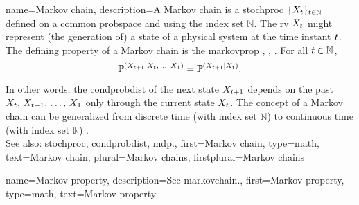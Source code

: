 {name={Markov chain},
	description={A Markov chain is a \gls{stochproc} $\{X_t \}_{t \in \mathbb{N}}$ 
		defined on a common \gls{probspace} and using the index set $\mathbb{N}$. The 
		\gls{rv} $X_t$ might represent (the generation of) a \gls{state} of a physical system 
		at the time instant $t$. The defining property of a Markov chain 
		is the \gls{markovprop} \cite{durrett2010probability}, \cite{papoulis}, \cite{NorrisMarkovChains1997}.
		For all $t \in \mathbb{N}$,
 		\begin{equation}
 			\nonumber \mathbb{P}^{(X_{t+1} \mid X_t,\,\ldots,\,X_1)} = \mathbb{P}^{(X_{t+1} \mid X_t)}. 
 		\end{equation}
 		In other words, the \gls{condprobdist} of the next \gls{state} $X_{t+1}$ 
		depends on the past $X_{t},\,X_{t-1},\,\dots,\,X_{1}$ 
		only through the current \gls{state} $X_{t}$. The concept of a 
		Markov chain can be generalized from discrete time (with index set $\mathbb{N}$) 
		to continuous time (with index set $\mathbb{R}$) \cite{NorrisMarkovChains1997}. 
		\\ 
		See also: \gls{stochproc}, \gls{condprobdist}, \gls{mdp}.},
	first={Markov chain},
	type=math,
    	text={Markov chain}, 
	plural={Markov chains}, 
	firstplural={Markov chains}
}

{name={Markov property},
	description={See \gls{markovchain}.},
	first={Markov property},
	type=math,
	text={Markov property}
}

